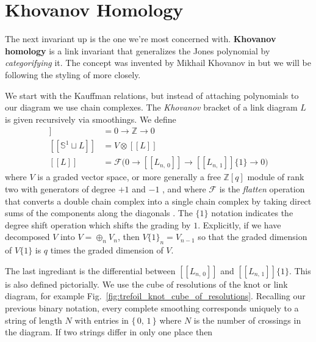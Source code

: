 \section{Khovanov Homology}
    The next invariant up is the one we're most concerned with.
    \textbf{Khovanov homology} is a link invariant that generalizes the
    Jones polynomial by \textit{categorifying} it. The concept was invented by
    Mikhail Khovanov in \cite{Khovanov1999CatJonesPoly} but we will be
    following the styling of \cite{BarNatanKhovanovJones} more closely.
    \par\hfill\par
    We start with the Kauffman relations, but instead of attaching polynomials
    to our diagram we use chain complexes. The \textit{Khovanov} bracket of a
    link diagram $L$ is given recursively via smoothings. We define
    \begin{align}
        [[\emptyset]]&=0\rightarrow\mathbb{Z}\rightarrow{0}\\
        [[\mathbb{S}^{1}\sqcup{L}]]&=V\otimes[[L]]\\
        [[L]]&=\mathcal{F}
        \big(
            0\rightarrow[[L_{n,\,0}]]\rightarrow[[L_{n,\,1}]]\{1\}\rightarrow{0}
        \big)
    \end{align}
    where $V$ is a graded vector space,
    or more generally a free $\mathbb{Z}[q]$
    module of rank two with generators of degree $+1$ and $-1$
    \cite[p.~362]{Khovanov1999CatJonesPoly}, and where
    $\mathcal{F}$ is the \textit{flatten} operation that converts a
    double chain complex into a single chain complex by taking direct sums
    of the components along the diagonals \cite[p.~338]{BarNatanKhovanovJones}.
    The $\{1\}$ notation indicates the degree shift operation which shifts the
    grading by $1$. Explicitly, if we have decomposed $V$ into
    $V=\oplus_{n}V_{n}$, then $V\{1\}_{n}=V_{n-1}$ so that the graded dimension
    of $V\{1\}$ is $q$ times the graded dimension of $V$.
    \par\hfill\par
    The last ingrediant is the differential between $[[L_{n,\,0}]]$ and
    $[[L_{n,\,1}]]\{1\}$. This is also defined pictorially. We use the cube of
    resolutions of the knot or link diagram, for example
    Fig.~\ref{fig:trefoil_knot_cube_of_resolutions}. Recalling our previous
    binary notation, every complete smoothing corresponds uniquely to a string
    of length $N$ with entries in $\{\,0,\,1\,\}$ where $N$ is the number of
    crossings in the diagram. If two strings differ in only one place then
